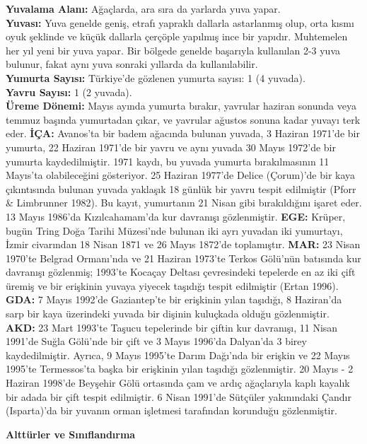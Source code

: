 \documentclass[
  letterpaper,
  DIV=11,
  numbers=noendperiod]{scrreprt}
\begin{document}
\textbf{Yuvalama Alanı:} Ağaçlarda, ara sıra da yarlarda yuva yapar.\\
\textbf{Yuvası:} Yuva genelde geniş, etrafı yapraklı dallarla
astarlanmış olup, orta kısmı oyuk şeklinde ve küçük dallarla çerçöple
yapılmış ince bir yapıdır. Muhtemelen her yıl yeni bir yuva yapar. Bir
bölgede genelde başarıyla kullanılan 2-3 yuva bulunur, fakat aynı yuva
sonraki yıllarda da kullanılabilir.\\
\textbf{Yumurta Sayısı:} Türkiye'de gözlenen yumurta sayısı: 1 (4
yuvada).\\
\textbf{Yavru Sayısı:} 1 (2 yuvada).\\
\textbf{Üreme Dönemi:} Mayıs ayında yumurta bırakır, yavrular haziran
sonunda veya temmuz başında yumurtadan çıkar, ve yavrular ağustos sonuna
kadar yuvayı terk eder. \textbf{İÇA:} Avanos'ta bir badem ağacında
bulunan yuvada, 3 Haziran 1971'de bir yumurta, 22 Haziran 1971'de bir
yavru ve aynı yuvada 30 Mayıs 1972'de bir yumurta kaydedilmiştir. 1971
kaydı, bu yuvada yumurta bırakılmasının 11 Mayıs'ta olabileceğini
gösteriyor. 25 Haziran 1977'de Delice (Çorum)'de bir kaya çıkıntısında
bulunan yuvada yaklaşık 18 günlük bir yavru tespit edilmiştir (Pforr \&
Limbrunner 1982). Bu kayıt, yumurtanın 21 Nisan gibi bırakıldığını
işaret eder. 13 Mayıs 1986'da Kızılcahamam'da kur davranışı
gözlenmiştir. \textbf{EGE:} Krüper, bugün Tring Doğa Tarihi Müzesi'nde
bulunan iki ayrı yuvadan iki yumurtayı, İzmir civarından 18 Nisan 1871
ve 26 Mayıs 1872'de toplamıştır. \textbf{MAR:} 23 Nisan 1970'te Belgrad
Ormanı'nda ve 21 Haziran 1973'te Terkos Gölü'nün batısında kur davranışı
gözlenmiş; 1993'te Kocaçay Deltası çevresindeki tepelerde en az iki çift
üremiş ve bir erişkinin yuvaya yiyecek taşıdığı tespit edilmiştir (Ertan
1996). \textbf{GDA:} 7 Mayıs 1992'de Gaziantep'te bir erişkinin yılan
taşıdığı, 8 Haziran'da sarp bir kaya üzerindeki yuvada bir dişinin
kuluçkada olduğu gözlenmiştir. \textbf{AKD:} 23 Mart 1993'te Taşucu
tepelerinde bir çiftin kur davranışı, 11 Nisan 1991'de Suğla Gölü'nde
bir çift ve 3 Mayıs 1996'da Dalyan'da 3 birey kaydedilmiştir. Ayrıca, 9
Mayıs 1995'te Darım Dağı'nda bir erişkin ve 22 Mayıs 1995'te
Termessos'ta başka bir erişkinin yılan taşıdığı gözlenmiştir. 20 Mayıs -
2 Haziran 1998'de Beyşehir Gölü ortasında çam ve ardıç ağaçlarıyla kaplı
kayalık bir adada bir çift tespit edilmiştir. 6 Nisan 1991'de Sütçüler
yakınındaki Çandır (Isparta)'da bir yuvanın orman işletmesi tarafından
korunduğu gözlenmiştir.

\textbf{Alttürler ve Sınıflandırma}
\end{document}
